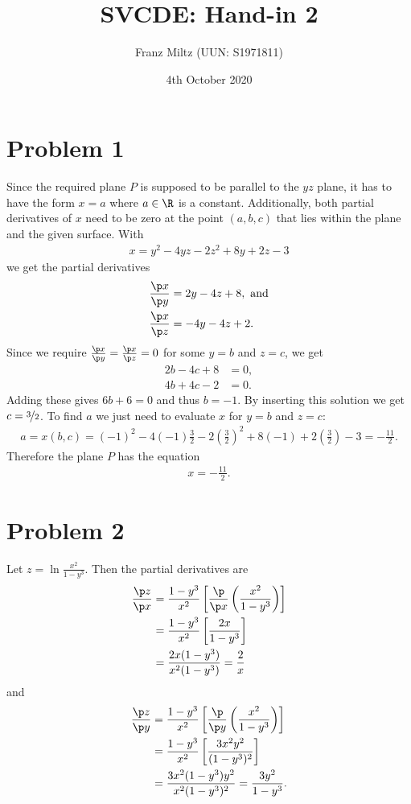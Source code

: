 \documentclass{article}
\begin{document}
\title{SVCDE: Hand-in 2}
\author{Franz Miltz (UUN: S1971811)}
\date{4th October 2020}
\maketitle
\section*{Problem 1}
Since the required plane $P$ is supposed to be parallel to the $yz$ plane, it
has to have the form $x=a$ where $a\in\R$ is a constant.
Additionally, both partial derivatives of $x$ need to be zero at the
point $(a,b,c)$ that lies within the plane and the given surface.
With
\begin{align*}
	x = y^2 - 4yz - 2z^2 + 8y + 2z -3
\end{align*}
we get the partial derivatives
\begin{align*}
	\frac{\p x}{\p y} & =2y - 4z + 8,\text{ and} \\
	\frac{\p x}{\p z} & =-4y-4z+2.
\end{align*}
Since we require $\frac{\p x}{\p y}=\frac{\p x}{\p z}=0$ for
some $y=b$ and $z=c$, we get
\begin{align*}
	2b - 4c + 8 & = 0, \\
	4b + 4c - 2 & = 0.
\end{align*}
Adding these gives $6b + 6 = 0$ and thus $b=-1$.
By inserting this solution we get $c=\nicefrac{3}{2}$.
To find $a$ we just need to evaluate $x$ for $y=b$ and $z=c$:
\begin{align*}
	a = x(b,c) = (-1)^2 - 4(-1)\frac{3}{2} - 2\left(\frac{3}{2}\right)^2
	+ 8(-1) + 2\left(\frac{3}{2}\right) - 3 = - \frac{11}{2}.
\end{align*}
Therefore the plane $P$ has the equation
\begin{align*}
	x = -\frac{11}{2}.
\end{align*}
\section*{Problem 2}
Let $ z = \ln\frac{x^2}{1-y^3}$. Then the partial derivatives are
\begin{align*}
	\frac{\p z}{\p x}
	 & =\frac{1-y^3}{x^2}\left[\frac{\p}{\p x}\left(\frac{x^2}{1-y^3}\right)\right] \\
	 & =\frac{1-y^3}{x^2}\left[\frac{2x}{1-y^3}\right]                              \\
	 & =\frac{2x(1-y^3)}{x^2(1-y^3)}=\frac{2}{x}
\end{align*}
and
\begin{align*}
	\frac{\p z}{\p y}
	 & =\frac{1-y^3}{x^2}\left[\frac{\p}{\p y}\left( \frac{x^2}{1-y^3}\right)\right] \\
	 & =\frac{1-y^3}{x^2}\left[\frac{3x^2y^2}{(1-y^3)^2}\right]                      \\
	 & =\frac{3x^2(1-y^3)y^2}{x^2(1-y^3)^2} =\frac{3y^2}{1-y^3}.
\end{align*}
\end{document}

